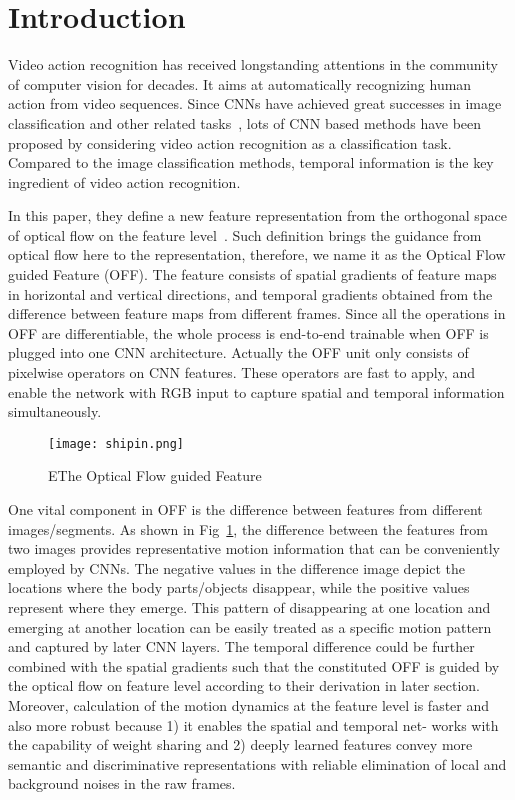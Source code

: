 \documentclass[10pt,twocolumn,letterpaper]{article}
\begin{document}
\section{Introduction}
Video action recognition has received longstanding attentions in the community of computer vision for decades. It aims at automatically recognizing human action from video sequences. Since CNNs have achieved great successes in image classification and other related tasks~\cite{name20,name34,name49,name51}, lots of CNN based methods have been proposed by considering video action recognition as a
classification task. Compared to the image classification methods, temporal information is the key ingredient of video action recognition.
\par In this paper, they define a new feature representation from
the orthogonal space of optical flow on the feature level~\cite{name16}. Such definition brings the guidance from optical flow here to the representation, therefore, we name it as the Optical Flow guided Feature (OFF). The feature consists of spatial gradients of feature maps in horizontal and vertical directions, and temporal gradients obtained from the difference between feature maps from different frames. Since all
the operations in OFF are differentiable, the whole process is end-to-end trainable when OFF is plugged into one CNN architecture. Actually the OFF unit only consists of pixelwise operators on CNN features. These operators are fast to apply, and enable the network with RGB input to capture
spatial and temporal information simultaneously.
  \begin{figure}[!htb]
  	\centering
  	\texttt{[image: shipin.png]}\\
  	\caption{EThe Optical Flow guided Feature}\label{Figure1} 
  \end{figure}
\par One vital component in OFF is the difference between features from different images/segments. As shown in Fig~\ref{Figure1}, the difference between the features from two images provides representative motion information that can be conveniently employed by CNNs. The negative values in the difference image depict the locations where the body parts/objects disappear, while the positive values represent where they emerge. This pattern of disappearing at one location and emerging at another location can be easily treated as a specific motion pattern and captured by later CNN layers. The temporal difference could be further combined with the spatial gradients such that the constituted OFF is guided by the optical flow on feature level according to their derivation in later section. Moreover, calculation of the motion dynamics at the feature level is faster and also more robust because 1) it enables the spatial and temporal net-
works with the capability of weight sharing and 2) deeply learned features convey more semantic and discriminative representations with reliable elimination of local and background noises in the raw frames.
\end{document}
